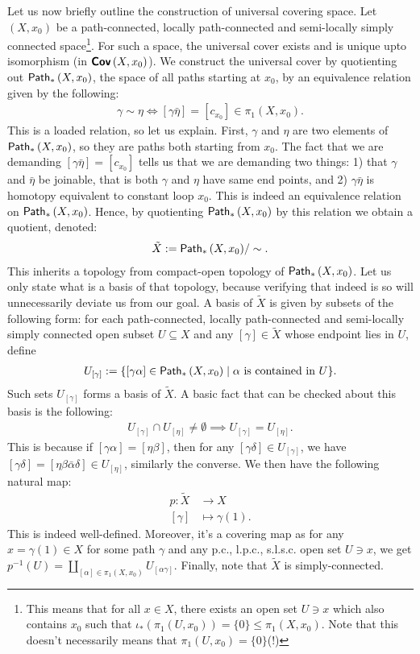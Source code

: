 \documentclass[letterpaper,11pt,twoside]{article}
\theoremstyle{definition}
\theoremstyle{definition}
\theoremstyle{definition}
\theoremstyle{definition}
\theoremstyle{definition}
\theoremstyle{definition}
\theoremstyle{remark}
\theoremstyle{definition}
\newcommand{\cat}[1]{{\fontfamily{lmss}\selectfont 
		\text{\textbf{#1}}
}}
\newcommand{\pps}[1]{{\fontfamily{lmss}\selectfont 
		\text{Path}_{*}\left(#1\right)
}}
\newcommand{\Cov}[1]{\cat{Cov}\left (#1\right )}
\begin{document}
Let us now briefly outline the construction of universal covering space. Let $ (X,x_0) $ be a path-connected, locally path-connected and semi-locally simply connected space\footnote{This means that for all $ x\in X $, there exists an open set $ U\ni x $ which also contains $ x_0 $ such that $ \iota_*(\pi_1(U,x_0)) = \{0\}\le \pi_1(X,x_0)$. Note that this doesn't necessarily means that $ \pi_1(U,x_0) = \{0\}$(!)}. For such a space, the universal cover exists and is unique upto isomorphism (in $ \Cov{X,x_0} $). We construct the universal cover by quotienting out $ \pps{X,x_0} $, the space of all paths starting at $ x_0 $, by an equivalence relation given by the following:
\begin{align*}
\gamma\sim \eta \iff [\gamma\bar{\eta}] = [c_{x_0}] \in  \pi_1(X,x_0).
\end{align*}
This is a loaded relation, so let us explain. First, $ \gamma $ and $ \eta $ are two elements of $ \pps{X,x_0} $, so they are paths both starting from $ x_0 $. The fact that we are demanding $ [\gamma\bar{\eta}] = [c_{x_0}]$ tells us that we are demanding two things: 1) that $ \gamma $ and $ \bar{\eta} $ be joinable, that is both $ \gamma $ and $ \eta $ have same end points, and 2) $ \gamma\bar{\eta} $ is homotopy equivalent to constant loop $ x_0 $. This is indeed an equivalence relation on $ \pps{X,x_0} $. Hence, by quotienting $ \pps{X,x_0} $ by this relation we obtain a quotient, denoted:
\begin{align*}
	\tilde{X} := \pps{X,x_0}/\sim.
\end{align*}
This inherits a topology from compact-open topology of $ \pps{X,x_0} $. Let us only state what is a basis of that topology, because verifying that indeed is so will unnecessarily deviate us from our goal. A basis of $ \tilde{X} $ is given by subsets of the following form: for each path-connected, locally path-connected and semi-locally simply connected open subset $ U\subseteq X $ and any $ [\gamma] \in \tilde{X} $ whose endpoint lies in $ U $, define
\begin{align*}
	U_{[\gamma]} := \{[\gamma\alpha]\in \pps{X,x_0}\;\vert\; \alpha \text{ is contained in $ U $}\}.
\end{align*}
Such sets $ U_{[\gamma]} $ forms a basis of $ \tilde{X} $. A basic fact that can be checked about this basis is the following:
\begin{align*}
	U_{[\gamma]} \cap U_{[\eta]} \neq \emptyset \implies U_{[\gamma]} = U_{[\eta]}.
\end{align*}
This is because if $ [\gamma\alpha ] = [\eta\beta] $, then for any $ [\gamma\delta] \in U_{[\gamma]} $, we have $ [\gamma\delta] = [\eta\beta\bar{\alpha}\delta] \in U_{[\eta]} $, similarly the converse. We then have the following natural map:
\begin{align*}
	p : \tilde{X} &\longrightarrow X\\
	[\gamma] &\longmapsto \gamma(1).
\end{align*}
This is indeed well-defined. Moreover, it's a covering map as for any $ x = \gamma(1)\in X $ for some path $ \gamma $ and any p.c., l.p.c., s.l.s.c. open set $ U \ni x $, we get $ p^{-1}(U) = \coprod_{[\alpha] \in \pi_1(X,x_0)} U_{[\alpha\gamma]} $. Finally, note that $ \tilde{X} $ is simply-connected.
\end{document}
